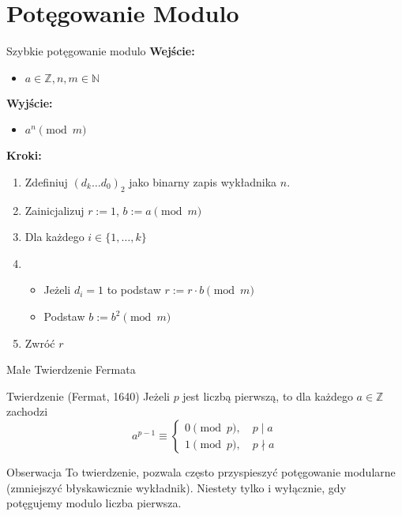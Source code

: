 \documentclass{beamer}
\begin{document}
\section{Potęgowanie Modulo}
\begin{frame}{Szybkie potęgowanie modulo}
    \textbf{Wejście:}
    \begin{itemize}
        \item $a \in \mathbb{Z}, n,m \in \mathbb{N}$ 
    \end{itemize}
    \textbf{Wyjście:}
    \begin{itemize}
        \item $a^{n} \pmod{m}$
    \end{itemize}
    \textbf{Kroki:}
    \begin{enumerate}
        \item Zdefiniuj $(d_k \ldots d_0)_2$ jako binarny zapis wykładnika $n$. 
        \item Zainicjalizuj $r:=1$, $b:= a \pmod{m}$ 
        \item Dla każdego $i \in \{1, \ldots, k\}$
        \item \begin{itemize}
            \item Jeżeli $d_i = 1$ to podstaw $r :=  r\cdot b \pmod{m}$
            \item Podstaw $b := b^2 \pmod{m}$ 
        \end{itemize}
        \item Zwróć $r$
    \end{enumerate}
\end{frame}

\begin{frame}{Małe Twierdzenie Fermata}
    \begin{block}{Twierdzenie (Fermat, 1640)}
        Jeżeli $p$ jest liczbą pierwszą, to dla każdego $a \in \mathbb{Z}$ zachodzi 
        $$a^{p-1} \equiv \begin{cases}
            0 \pmod{p}, \quad p \mid a \\ 
            1 \pmod{p}, \quad p \nmid a 
        \end{cases}$$
    \end{block}
    \pause 
    \begin{alertblock}{Obserwacja}
        To twierdzenie, pozwala często przyspieszyć potęgowanie modularne (zmniejszyć błyskawicznie wykładnik). Niestety tylko i wyłącznie, gdy potęgujemy modulo liczba pierwsza.
    \end{alertblock}
\end{frame}
\end{document}
